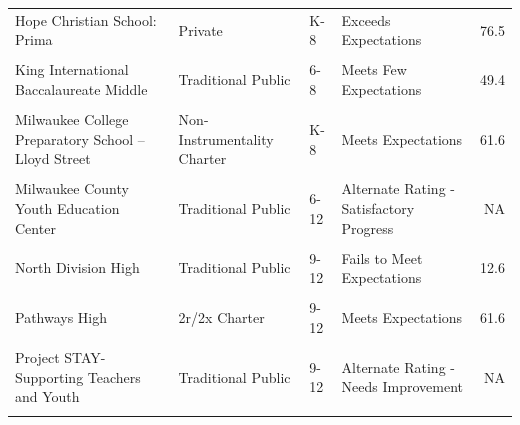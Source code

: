 \documentclass[
]{article}
\begin{document}
\begin{longtable}[t]{>{\raggedright\arraybackslash}p{10em}ll>{\raggedright\arraybackslash}p{10em}r}
Hope Christian School: Prima & Private & K-8 & Exceeds Expectations & 76.5\\
\cellcolor{gray!6}{Jackson Elementary} & \cellcolor{gray!6}{Traditional Public} & \cellcolor{gray!6}{K-5} & \cellcolor{gray!6}{Fails to Meet Expectations} & \cellcolor{gray!6}{26.0}\\
\addlinespace
King International Baccalaureate Middle & Traditional Public & 6-8 & Meets Few Expectations & 49.4\\
\cellcolor{gray!6}{Metcalfe Elementary} & \cellcolor{gray!6}{Traditional Public} & \cellcolor{gray!6}{K-8} & \cellcolor{gray!6}{Meets Expectations} & \cellcolor{gray!6}{61.2}\\
Milwaukee College Preparatory School -- Lloyd Street & Non-Instrumentality Charter & K-8 & Meets Expectations & 61.6\\
\cellcolor{gray!6}{Milwaukee College Preparatory School: Lola Rowe North Campus} & \cellcolor{gray!6}{Non-Instrumentality Charter} & \cellcolor{gray!6}{K-8} & \cellcolor{gray!6}{Exceeds Expectations} & \cellcolor{gray!6}{76.3}\\
Milwaukee County Youth Education Center & Traditional Public & 6-12 & Alternate Rating - Satisfactory Progress & NA\\
\addlinespace
\cellcolor{gray!6}{Next Door Charter} & \cellcolor{gray!6}{Non-Instrumentality Charter} & \cellcolor{gray!6}{K-5} & \cellcolor{gray!6}{NA} & \cellcolor{gray!6}{NA}\\
North Division High & Traditional Public & 9-12 & Fails to Meet Expectations & 12.6\\
\cellcolor{gray!6}{NOVA-Northwest Opportunities Vocational Academy} & \cellcolor{gray!6}{Partnership} & \cellcolor{gray!6}{9-12} & \cellcolor{gray!6}{Alternate Rating - Needs Improvement} & \cellcolor{gray!6}{NA}\\
Pathways High & 2r/2x Charter & 9-12 & Meets Expectations & 61.6\\
\cellcolor{gray!6}{Penfield Montessori Academy} & \cellcolor{gray!6}{2r/2x Charter} & \cellcolor{gray!6}{K-5} & \cellcolor{gray!6}{Alternate Rating - Satisfactory Progress} & \cellcolor{gray!6}{NA}\\
\addlinespace
Project STAY-Supporting Teachers and Youth & Traditional Public & 9-12 & Alternate Rating - Needs Improvement & NA\\
\cellcolor{gray!6}{Riverwest Elementary} & \cellcolor{gray!6}{Traditional Public} & \cellcolor{gray!6}{K-5} & \cellcolor{gray!6}{Meets Few Expectations} & \cellcolor{gray!6}{51.1}\\

\end{longtable}
\end{document}
